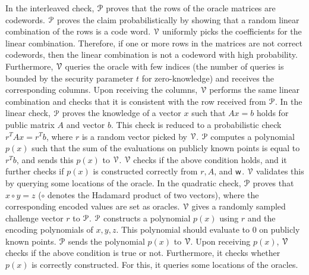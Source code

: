 In the interleaved check, $\mathcal{P}$ proves that the rows of the oracle matrices are codewords. $\mathcal{P}$ proves the claim probabilistically by showing that a random linear combination of the rows is a code word. $\mathcal{V}$ uniformly picks the coefficients for the linear combination.
Therefore, if one or more rows in the matrices are not correct codewords, then the linear combination is not a codeword with high probability. Furthermore, $\mathcal{V}$ queries the oracle with few indices (the number of queries is bounded by the security parameter $t$ for zero-knowledge) and receives the corresponding columns. Upon receiving the columns, $\mathcal{V}$ performs the same linear combination and checks that it is consistent with the row received from $\mathcal{P}$.
In the linear check, $\mathcal{P}$ proves the knowledge of a vector $x$ such that $Ax = b$ holds for public matrix $A$ and vector $b$. This check is reduced to a probabilistic check $r^TAx = r^T b$, where $r$ is a random vector picked by $\mathcal{V}$. $\mathcal{P}$ computes a polynomial $p(x)$ such that the sum of the evaluations on publicly known points is equal to $r^Tb$, and sends this $p(x)$ to $\mathcal{V}$. $\mathcal{V}$ checks if the above condition holds, and it further checks if $p(x)$ is constructed correctly from $r, A$, and $\mathsf{w}$. $\mathcal{V}$ validates this by querying some locations of the oracle.
In the quadratic check, $\mathcal{P}$ proves that $x \circ y = z$ ($\circ$ denotes the Hadamard product of two vectors), where the corresponding encoded values are set as oracles. $\mathcal{V}$ gives a randomly sampled challenge vector $r$ to $\mathcal{P}$. $\mathcal{P}$ constructs a polynomial $p(x)$ using $r$ and the encoding polynomials of $x, y, z$. This polynomial should evaluate to $0$ on publicly known points. $\mathcal{P}$ sends the polynomial $p(x)$ to $\mathcal{V}$. Upon receiving $p(x)$, $\mathcal{V}$ checks if the above condition is true or not. Furthermore, it checks whether $p(x)$ is correctly constructed. For this, it queries some locations of the oracles.


